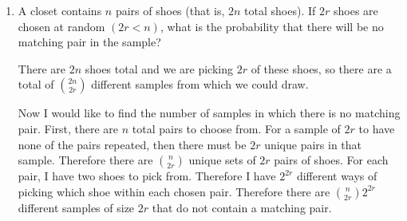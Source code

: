 \documentclass[10pt,twoside]{article}
\begin{document}
\begin{enumerate}
    
    \item A closet contains $n$ pairs of shoes (that is, $2n$ total shoes). If $2r$ shoes are chosen at random $(2r < n)$, what is the probability that there will be no matching pair in the sample? 
    
    {\color{blue} There are $2n$ shoes total and we are picking $2r$ of these shoes, so there are a total of $\binom{2n}{2r}$ different samples from which we could draw.

    Now I would like to find the number of samples in which there is no matching pair. First, there are $n$ total pairs to choose from. For a sample of $2r$ to have none of the pairs repeated, then there must be $2r$ unique pairs in that sample. Therefore there are $\binom{n}{2r}$ unique sets of $2r$ pairs of shoes. For each pair, I have two shoes to pick from. Therefore I have $2^{2r}$ different ways of picking which shoe within each chosen pair. Therefore there are $\binom{n}{2r}2^{2r}$ different samples of size $2r$ that do not contain a matching pair.

}
\end{enumerate}
\end{document}

